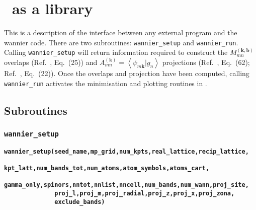 \chapter{\wannier\ as a library}\label{ch:wann-lib}

This is a description of the interface between any external program and
the wannier code. There are two subroutines: \verb#wannier_setup# and
\verb#wannier_run#. Calling \verb#wannier_setup# will return
information required to 
construct the $M_{mn}^{(\mathbf{k,b})}$ overlaps (Ref.~\cite{MV},
Eq.~(25)) and $A_{mn}^{(\mathbf{k})}=\left\langle
\psi_{m\mathbf{k}}|g_{n}\right\rangle$ projections (Ref.~\cite{MV},
Eq.~(62); Ref.~\cite{SMV}, Eq.~(22)). Once 
the overlaps and projection have been computed, calling
\verb#wannier_run# activates the minimisation and plotting routines in
\wannier.


\section{Subroutines}

\subsection{{\tt wannier\_setup}}

{\noindent \bf \verb#wannier_setup(seed_name,mp_grid,num_kpts,real_lattice,recip_lattice,#\\
\verb#              kpt_latt,num_bands_tot,num_atoms,atom_symbols,atoms_cart,#\\
\verb#              gamma_only,spinors,nntot,nnlist,nncell,num_bands,num_wann,proj_site,#\\
\verb#              proj_l,proj_m,proj_radial,proj_z,proj_x,proj_zona,#\\
\verb#              exclude_bands)#}

